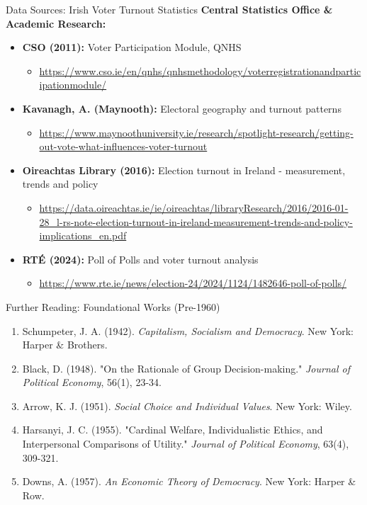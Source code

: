 \documentclass[10pt]{beamer}
\begin{document}
\begin{frame}{Data Sources: Irish Voter Turnout Statistics}
\textbf{Central Statistics Office \& Academic Research:}



\footnotesize
\begin{itemize}
\item \textbf{CSO (2011):} Voter Participation Module, QNHS
\begin{itemize}
\scriptsize
\item \url{https://www.cso.ie/en/qnhs/qnhsmethodology/voterregistrationandparticipationmodule/}
\end{itemize}

\item \textbf{Kavanagh, A. (Maynooth):} Electoral geography and turnout patterns
\begin{itemize}
\scriptsize
\item \url{https://www.maynoothuniversity.ie/research/spotlight-research/getting-out-vote-what-influences-voter-turnout}
\end{itemize}

\item \textbf{Oireachtas Library (2016):} Election turnout in Ireland - measurement, trends and policy
\begin{itemize}
\scriptsize
\item \url{https://data.oireachtas.ie/ie/oireachtas/libraryResearch/2016/2016-01-28_l-rs-note-election-turnout-in-ireland-measurement-trends-and-policy-implications_en.pdf}
\end{itemize}

\item \textbf{RTÉ (2024):} Poll of Polls and voter turnout analysis
\begin{itemize}
\scriptsize
\item \url{https://www.rte.ie/news/election-24/2024/1124/1482646-poll-of-polls/}
\end{itemize}
\end{itemize}
\end{frame}

\begin{frame}{Further Reading: Foundational Works (Pre-1960)}
\footnotesize
\begin{enumerate}
\item Schumpeter, J. A. (1942). \emph{Capitalism, Socialism and Democracy}. New York: Harper \& Brothers.
\item Black, D. (1948). "On the Rationale of Group Decision-making." \emph{Journal of Political Economy}, 56(1), 23-34.
\item Arrow, K. J. (1951). \emph{Social Choice and Individual Values}. New York: Wiley.
\item Harsanyi, J. C. (1955). "Cardinal Welfare, Individualistic Ethics, and Interpersonal Comparisons of Utility." \emph{Journal of Political Economy}, 63(4), 309-321.
\item Downs, A. (1957). \emph{An Economic Theory of Democracy}. New York: Harper \& Row.
\end{enumerate}
\end{frame}
\end{document}
